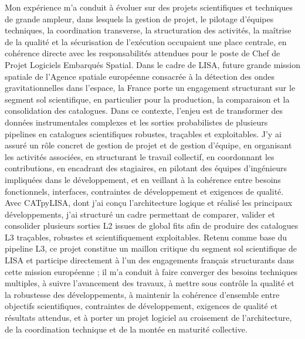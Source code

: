 \documentclass[11pt,a4paper]{altacv}
\begin{document}
{Mon expérience m'a conduit à évoluer sur des projets scientifiques et techniques de grande ampleur, dans lesquels la gestion de projet, le pilotage d'équipes techniques, la coordination transverse, la structuration des activités, la maîtrise de la qualité et la sécurisation de l'exécution occupaient une place centrale, en cohérence directe avec les responsabilités attendues pour le poste de Chef de Projet Logiciels Embarqués Spatial. Dans le cadre de LISA, future grande mission spatiale de l'Agence spatiale européenne consacrée à la détection des ondes gravitationnelles dans l'espace, la France porte un engagement structurant sur le segment sol scientifique, en particulier pour la production, la comparaison et la consolidation des catalogues. Dans ce contexte, l'enjeu est de transformer des données instrumentales complexes et les sorties probabilistes de plusieurs pipelines en catalogues scientifiques robustes, traçables et exploitables. J'y ai assuré un rôle concret de gestion de projet et de gestion d'équipe, en organisant les activités associées, en structurant le travail collectif, en coordonnant les contributions, en encadrant des stagiaires, en pilotant des équipes d'ingénieurs impliquées dans le développement, et en veillant à la cohérence entre besoins fonctionnels, interfaces, contraintes de développement et exigences de qualité. Avec CATpyLISA, dont j'ai conçu l'architecture logique et réalisé les principaux développements, j'ai structuré un cadre permettant de comparer, valider et consolider plusieurs sorties L2 issues de global fits afin de produire des catalogues L3 traçables, robustes et scientifiquement exploitables. Retenu comme base du pipeline L3, ce projet constitue un maillon critique du segment sol scientifique de LISA et participe directement à l'un des engagements français structurants dans cette mission européenne ; il m'a conduit à faire converger des besoins techniques multiples, à suivre l'avancement des travaux, à mettre sous contrôle la qualité et la robustesse des développements, à maintenir la cohérence d'ensemble entre objectifs scientifiques, contraintes de développement, exigences de qualité et résultats attendus, et à porter un projet logiciel au croisement de l'architecture, de la coordination technique et de la montée en maturité collective.

}
\end{document}
